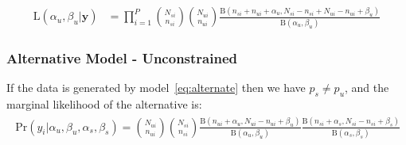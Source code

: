 \documentclass[11pt]{article}
\begin{document}
 \begin{align}
  	\mathrm{L}(\alpha_u,\beta_u|\mathbf{y})
	&=\prod_{i=1}^P\binom{N_{si}}{n_{si}}\binom{N_{ui}}{n_{ui}}\frac{\mathrm{B}(n_{si}+n_{ui}+\alpha_u,N_{si}-n_{si}+N_{ui}-n_{ui}+\beta_u)}{\mathrm{B}(\alpha_u,\beta_u)}\label{eq:model1post}
 \end{align} 
 \subsubsection{Alternative Model - Unconstrained}
 If the data is generated by model~\eqref{eq:alternate} then we have  $p_s\ne p_u$, and the marginal likelihood of the alternative is:
\begin{align}
	\begin{split}
\mathrm{Pr}(y_i|\alpha_u,\beta_u,\alpha_s,\beta_s) =\binom{N_{ui}}{n_{ui}} \binom{N_{si}}{n_{si}}\frac{\mathrm{B}(n_{ui}+\alpha_u,N_{ui}-n_{ui}+\beta_u)}{\mathrm{B}(\alpha_u,\beta_u)}\frac{\mathrm{B}(n_{si}+\alpha_s,N_{si}-n_{si}+\beta_s)}{\mathrm{B}(\alpha_s,\beta_s)}\label{model2:unconstrained}
\end{split}
\end{align}
\end{document}
